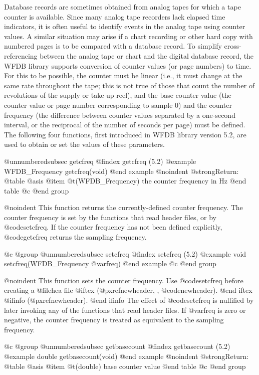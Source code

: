 {{{{{{{{{Database records are sometimes obtained from analog tapes for which a
tape counter is available.  Since many analog tape recorders lack
elapsed time indicators, it is often useful to identify events in the
analog tape using counter values.  A similar situation may arise if a
chart recording or other hard copy with numbered pages is to be compared
with a database record.  To simplify cross-referencing between the
analog tape or chart and the digital database record, the WFDB library
supports conversion of counter values (or page numbers) to time.  For this
to be possible, the counter must be linear (i.e., it must change at the
same rate throughout the tape; this is not true of those that count the
number of revolutions of the supply or take-up reel), and the base
counter value (the counter value or page number corresponding to sample
0) and the counter frequency (the difference between counter values
separated by a one-second interval, or the reciprocal of the number of
seconds per page) must be defined.  The following four functions,
first introduced in WFDB library version 5.2, are used to obtain or set
the values of these parameters.

@unnumberedsubsec getcfreq
@findex getcfreq (5.2)
@example
WFDB_Frequency getcfreq(void)
@end example
@noindent
@strong{Return:}
@table @asis
@item @t{(WFDB_Frequency)}
the counter frequency in Hz
@end table
@c @end group

@noindent
This function returns the currently-defined counter frequency.  The
counter frequency is set by the functions that read header
files, or by @code{setcfreq}.  If the counter frequency has not been
defined explicitly, @code{getcfreq} returns the sampling frequency.

@c @group
@unnumberedsubsec setcfreq
@findex setcfreq (5.2)
@example
void setcfreq(WFDB_Frequency @var{freq})
@end example
@c @end group

@noindent
This function sets the counter frequency.  Use @code{setcfreq}
before creating a @file{hea} file
@iftex
(@pxref{newheader, , @code{newheader}}).
@end iftex
@ifinfo
(@pxref{newheader}).
@end ifinfo
The effect of @code{setcfreq} is nullified by later invoking any of the
functions that read header files.  If @var{freq} is zero or
negative, the counter frequency is treated as equivalent to the sampling
frequency.

@c @group
@unnumberedsubsec getbasecount
@findex getbasecount (5.2)
@example
double getbasecount(void)
@end example
@noindent
@strong{Return:}
@table @asis
@item @t{(double)}
base counter value
@end table
@c @end group

}}}}}}}}}
